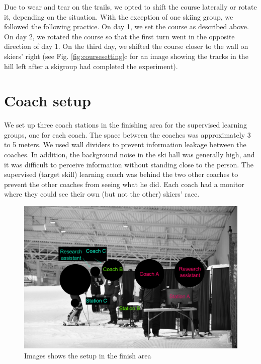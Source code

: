 \documentclass[pdflatex,sn-mathphys-num]{sn-jnl}%
\theoremstyle{thmstyleone}%
\theoremstyle{thmstyletwo}%
\theoremstyle{thmstylethree}%
\begin{document}
\begin{appendices}
Due to wear and tear on the trails, we opted to shift the course laterally or rotate it, depending on the situation. With the exception of one skiing group, we followed the following practice. On day 1, we set the course as described above. On day 2, we rotated the course so that the first turn went in the opposite direction of day 1. On the third day, we shifted the course closer to the wall on skiers' right (see Fig. \ref{fig:coursesetting}c for an image showing the tracks in the hill left after a skigroup had completed the experiment). 


\section{Coach setup}
We set up three coach stations in the finishing area for the supervised learning groups, one for each coach. The space between the coaches was approximately 3 to 5 meters. We used wall dividers to prevent information leakage between the coaches. In addition, the background noise in the ski hall was generally high, and it was difficult to perceive information without standing close to the person. The supervised (target skill) learning coach was behind the two other coaches to prevent the other coaches from seeing what he did. Each coach had a monitor where they could see their own (but not the other) skiers' race.

\begin{figure}[H]
\centering
\includegraphics[width=\linewidth]{figures/figure_stations3.jpg}
\caption{Images shows the setup in the finish area
}
\label{fig:coachstation}
\end{figure}
 





\end{appendices}
\end{document}
